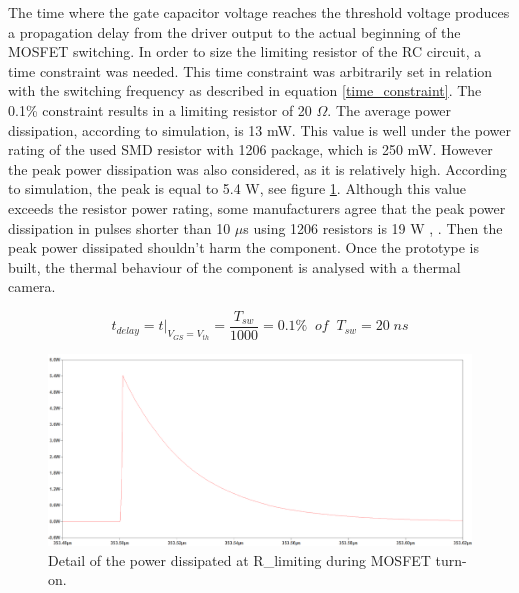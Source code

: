 The time where the gate capacitor voltage reaches the threshold voltage produces a propagation delay from the driver output to the actual beginning of the MOSFET switching. In order to size the limiting resistor of the RC circuit, a time constraint was needed. This time constraint was arbitrarily set in relation with the switching frequency as described in equation \ref{time_constraint}. The 0.1\% constraint results in a limiting resistor of 20 $\Omega$. The average power dissipation, according to simulation, is 13 mW. This value is well under the power rating of the used SMD resistor with 1206 package, which is 250 mW. However the peak power dissipation was also considered, as it is relatively high. According to simulation, the peak is equal to 5.4 W, see figure \ref{gate_resistor_power_dissipation}. Although this value exceeds the resistor power rating, some manufacturers agree that the peak power dissipation in pulses shorter than 10 $\mu$s using 1206 resistors is 19 W \cite{pulse_withstanding_chip_resistors}, \cite{gate_driver_design_infineon}. Then the peak power dissipated shouldn't harm the component. Once the prototype is built, the thermal behaviour of the component is analysed with a thermal camera. 

\begin{equation} \label{time_constraint}
t_{delay} = t\big\rvert_{V_{GS} = V_{th}} =\frac{T_{sw}}{1000} = 0.1 \% \;\; of \;\; T_{sw} = 20 \; ns
\end{equation}


\begin{figure}[H]
	\begin{center}
		\includegraphics[width=1.15\textwidth]{../Pictures/P1/Component_sizing/Gate_resistor_power_dissipation.png}
		\caption{Detail of the power dissipated at R\_limiting during MOSFET turn-on.}
		\label{gate_resistor_power_dissipation}
	\end{center}	
\end{figure}
 
